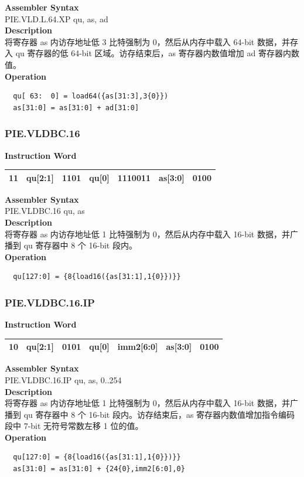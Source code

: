 \textbf{Assembler Syntax} \\
PIE.VLD.L.64.XP qu, as, ad \\
\textbf{Description} \\
将寄存器 as 内访存地址低 3 比特强制为 0，然后从内存中载入 64-bit 数据，并存入 qu 寄存器的低 64-bit 区域。访存结束后，as 寄存器内数值增加 ad 寄存器内数值。\\
\textbf{Operation}
\begin{lstlisting}
  qu[ 63:  0] = load64({as[31:3],3{0}})
  as[31:0] = as[31:0] + ad[31:0]
\end{lstlisting}

\newpage
\subsubsection{PIE.VLDBC.16}\label{instruction:PIEVLDBC16}
\setlength\tabcolsep{6pt}
\textbf{Instruction Word} \\
\begin{tabular}{|c|c|c|c|c|c|c|}
	\hline
	11 & qu[2:1] & 1101 & qu[0] & 1110011 & as[3:0] & 0100 \\
	\hline
\end{tabular}

\textbf{Assembler Syntax} \\
PIE.VLDBC.16 qu, as \\
\textbf{Description} \\
将寄存器 as 内访存地址低 1 比特强制为 0，然后从内存中载入 16-bit 数据，并广播到 qu 寄存器中 8 个 16-bit 段内。\\
\textbf{Operation}
\begin{lstlisting}
  qu[127:0] = {8{load16({as[31:1],1{0}})}}
\end{lstlisting}

\newpage
\subsubsection{PIE.VLDBC.16.IP}\label{instruction:PIEVLDBC16IP}
\setlength\tabcolsep{6pt}
\textbf{Instruction Word} \\
\begin{tabular}{|c|c|c|c|c|c|c|}
	\hline
	10 & qu[2:1] & 0101 & qu[0] & imm2[6:0] & as[3:0] & 0100 \\
	\hline
\end{tabular}

\textbf{Assembler Syntax} \\
PIE.VLDBC.16.IP qu, as, 0..254 \\
\textbf{Description} \\
将寄存器 as 内访存地址低 1 比特强制为 0，然后从内存中载入 16-bit 数据，并广播到 qu 寄存器中 8 个 16-bit 段内。访存结束后，as 寄存器内数值增加指令编码段中 7-bit 无符号常数左移 1 位的值。\\
\textbf{Operation}
\begin{lstlisting}
  qu[127:0] = {8{load16({as[31:1],1{0}})}}
  as[31:0] = as[31:0] + {24{0},imm2[6:0],0}
\end{lstlisting}

